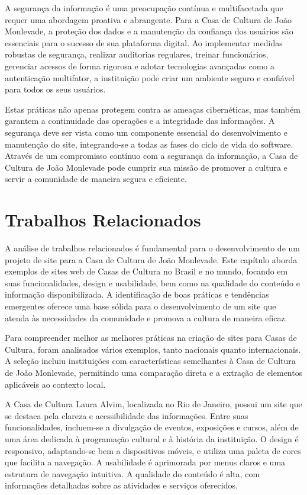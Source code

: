 A segurança da informação é uma preocupação contínua e multifacetada que requer uma abordagem proativa e abrangente. Para a Casa de Cultura de João Monlevade, a proteção dos dados e a manutenção da confiança dos usuários são essenciais para o sucesso de sua plataforma digital. Ao implementar medidas robustas de segurança, realizar auditorias regulares, treinar funcionários, gerenciar acessos de forma rigorosa e adotar tecnologias avançadas como a autenticação multifator, a instituição pode criar um ambiente seguro e confiável para todos os seus usuários.

Estas práticas não apenas protegem contra as ameaças cibernéticas, mas também garantem a continuidade das operações e a integridade das informações. A segurança deve ser vista como um componente essencial do desenvolvimento e manutenção do site, integrando-se a todas as fases do ciclo de vida do software. Através de um compromisso contínuo com a segurança da informação, a Casa de Cultura de João Monlevade pode cumprir sua missão de promover a cultura e servir a comunidade de maneira segura e eficiente.

\section{Trabalhos Relacionados}

A análise de trabalhos relacionados é fundamental para o desenvolvimento de um projeto de site para a Casa de Cultura de João Monlevade. Este capítulo aborda exemplos de sites web de Casas de Cultura no Brasil e no mundo, focando em suas funcionalidades, design e usabilidade, bem como na qualidade do conteúdo e informação disponibilizada. A identificação de boas práticas e tendências emergentes oferece uma base sólida para o desenvolvimento de um site que atenda às necessidades da comunidade e promova a cultura de maneira eficaz.

Para compreender melhor as melhores práticas na criação de sites para Casas de Cultura, foram analisados vários exemplos, tanto nacionais quanto internacionais. A seleção incluiu instituições com características semelhantes à Casa de Cultura de João Monlevade, permitindo uma comparação direta e a extração de elementos aplicáveis ao contexto local.

A Casa de Cultura Laura Alvim, localizada no Rio de Janeiro, possui um site que se destaca pela clareza e acessibilidade das informações. Entre suas funcionalidades, incluem-se a divulgação de eventos, exposições e cursos, além de uma área dedicada à programação cultural e à história da instituição. O design é responsivo, adaptando-se bem a dispositivos móveis, e utiliza uma paleta de cores que facilita a navegação. A usabilidade é aprimorada por menus claros e uma estrutura de navegação intuitiva. A qualidade do conteúdo é alta, com informações detalhadas sobre as atividades e serviços oferecidos.

